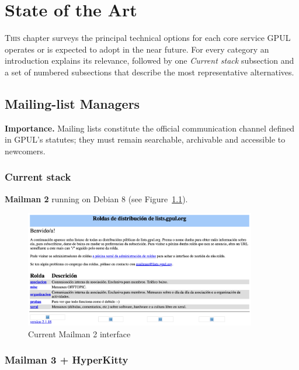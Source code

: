 %

\chapter{State of the Art}
\label{chap:state-of-the-art}

\lettrine{T}{his} chapter surveys the principal technical options for each core service GPUL operates or is expected to adopt in the near future.  
For every category an introduction explains its relevance, followed by one \emph{Current stack} subsection and a set of numbered subsections that describe the most representative alternatives.  

\section{Mailing-list Managers}

\textbf{Importance.}  Mailing lists constitute the official communication channel defined in GPUL's statutes; they must remain searchable, archivable and accessible to newcomers.

\subsection{Current stack}
\textbf{Mailman 2} running on Debian 8 (see Figure~\ref{fig:mailman2}).

\begin{figure}[H]
  \centering
  \includegraphics[width=0.9\textwidth]{imaxes/mailman-2-current.png}
  \caption{Current Mailman 2 interface}
  \label{fig:mailman2}
\end{figure}

\subsection{Mailman 3 + HyperKitty}


